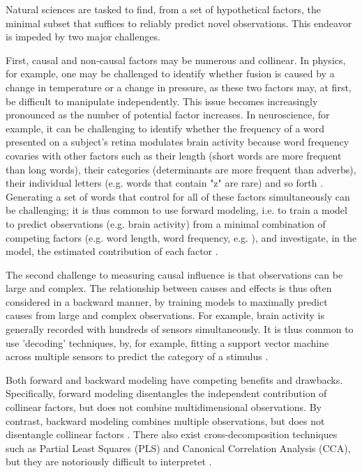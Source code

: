 Natural sciences are tasked to find, from a set of hypothetical factors, the minimal subset that suffices to reliably predict novel observations. This endeavor is impeded by two major challenges.

First, causal and non-causal factors may be numerous and collinear. In physics, for example, one may be challenged to identify whether fusion is caused by a change in temperature or a change in pressure, as these two factors may, at first, be difficult to manipulate independently. This issue becomes increasingly pronounced as the number of potential factor increases. In neuroscience, for example, it can be challenging to identify whether the frequency of a word presented on a subject's retina modulates brain activity because word frequency covaries with other factors such as their length (short words are more frequent than long words), their categories (determinants are more frequent than adverbs), their individual letters (e.g. words that contain "z" are rare) and so forth \citep{kutas2011thirty,pegado2014timing}. Generating a set of words that control for all of these factors simultaneously can be challenging; it is thus common to use forward modeling, i.e. to train a model to predict observations (e.g. brain activity) from a minimal combination of competing factors (e.g. word length, word frequency, e.g. \citep{huth2016natural}), and investigate, in the model, the estimated contribution of each factor \citep{friston1994statistical}.

The second challenge to measuring causal influence is that observations can be large and complex. The relationship between causes and effects is thus often considered in a backward manner, by training models to maximally predict causes from large and complex observations. For example, brain activity is generally recorded with hundreds of sensors simultaneously. It is thus common to use 'decoding' techniques, by, for example, fitting a support vector machine across multiple sensors to predict the category of a stimulus \citep{cichy2014resolving, king2016brain, kriegeskorte2008representational, norman2006beyond}.

Both forward and backward modeling have competing benefits and drawbacks. Specifically, forward modeling disentangles the independent contribution of collinear factors, but does not combine multidimensional observations. By contrast, backward modeling combines multiple observations, but does not disentangle collinear factors \cite{weichwald2015causal, hebart2018deconstructing, king2018encoding}. There also exist cross-decomposition techniques such as Partial Least Squares (PLS) and Canonical Correlation Analysis (CCA), but they are notoriously difficult to interpretet \citep{lebart1995statistique}.

